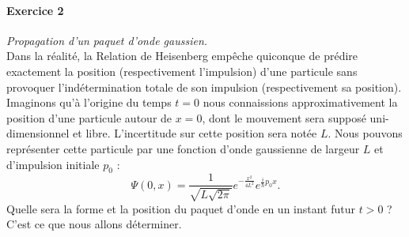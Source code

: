 \paragraph{Exercice 2} \textit{Propagation d'un paquet d'onde gaussien.} \\
Dans la réalité, la Relation de Heisenberg empêche quiconque de prédire exactement la position (respectivement l'impulsion) d'une particule sans provoquer l'indétermination totale de son impulsion (respectivement sa position). Imaginons qu'à l'origine du temps $t=0$ nous connaissions approximativement la position d'une particule autour de $x=0$, dont le mouvement sera supposé uni-dimensionnel et libre. L'incertitude sur cette position sera notée $L$. Nous pouvons représenter cette particule par une fonction d'onde gaussienne de largeur $L$ et d'impulsion initiale $p_0$ :
\begin{equation}
\Psi(0,x) = \frac{1}{\sqrt{L\sqrt{2\pi}}} e^{-\frac{x^2}{4L^2}} e^{\frac{i}{\hbar} p_0 x}.
\end{equation}	
Quelle sera la forme et la position du paquet d'onde en un instant futur $t>0$ ? C'est ce que nous allons déterminer.
